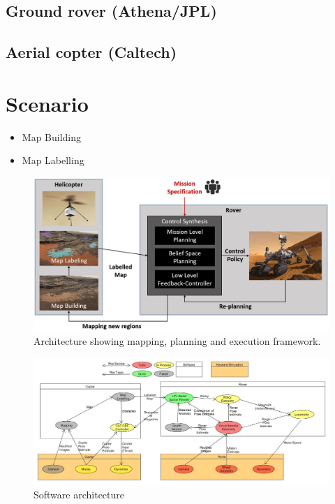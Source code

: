 \documentclass[conference]{IEEEtran}
\begin{document}
\subsection{Ground rover (Athena/JPL)}


\subsection{Aerial copter (Caltech)}



\section{Scenario}
\begin{itemize}
  \item Map Building
  \item Map Labelling
\end{itemize}

\begin{figure}[th!]
	\centering
	\includegraphics[width=\columnwidth]{figs/FunctionalArcV4.png}
	\caption{Architecture showing mapping, planning and execution framework.}
	\label{fig:FuncArc}
\end{figure}    	

\begin{figure}
    \centering
    \includegraphics[width=\textwidth]{BeliefSpaceTemporalLogic/figs/SoftwareArch.jpg}
    \caption{Software architecture}
    \label{fig:software_arch}
\end{figure}
\end{document}
